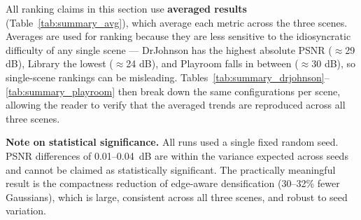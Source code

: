 All ranking claims in this section use \textbf{averaged results} (Table~\ref{tab:summary_avg}), which average each metric across the three scenes. Averages are used for ranking because they are less sensitive to the idiosyncratic difficulty of any single scene — DrJohnson has the highest absolute PSNR ($\approx$29 dB), Library the lowest ($\approx$24 dB), and Playroom falls in between ($\approx$30 dB), so single-scene rankings can be misleading. Tables~\ref{tab:summary_drjohnson}--\ref{tab:summary_playroom} then break down the same configurations per scene, allowing the reader to verify that the averaged trends are reproduced across all three scenes.

\textbf{Note on statistical significance.} All runs used a single fixed random seed. PSNR differences of 0.01--0.04~dB are within the variance expected across seeds and cannot be claimed as statistically significant. The practically meaningful result is the compactness reduction of edge-aware densification (30--32\% fewer Gaussians), which is large, consistent across all three scenes, and robust to seed variation.

